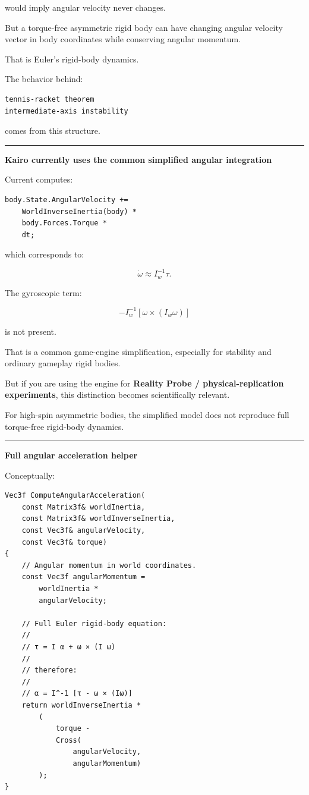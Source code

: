 would imply angular velocity never changes.

But a torque-free asymmetric rigid body can have changing angular velocity vector in body coordinates while conserving angular momentum.

That is Euler's rigid-body dynamics.

The behavior behind:

\begin{verbatim}
tennis-racket theorem
intermediate-axis instability
\end{verbatim}

comes from this structure.

\begin{center}\rule{0.5\linewidth}{0.5pt}\end{center}

\textbf{Kairo currently uses the common simplified angular integration}

Current  computes:

\begin{verbatim}
body.State.AngularVelocity +=
    WorldInverseInertia(body) *
    body.Forces.Torque *
    dt;
\end{verbatim}

which corresponds to:

\[
\dot\omega
\approx
I_w^{-1}\tau.
\]

The gyroscopic term:

\[
-I_w^{-1}
[
\omega\times(I_w\omega)
]
\]

is not present.

That is a common game-engine simplification, especially for stability and ordinary gameplay rigid bodies.

But if you are using the engine for \textbf{Reality Probe / physical-replication experiments}, this distinction becomes scientifically relevant.

For high-spin asymmetric bodies, the simplified model does not reproduce full torque-free rigid-body dynamics.

\begin{center}\rule{0.5\linewidth}{0.5pt}\end{center}

\textbf{Full angular acceleration helper}

Conceptually:

\begin{verbatim}
Vec3f ComputeAngularAcceleration(
    const Matrix3f& worldInertia,
    const Matrix3f& worldInverseInertia,
    const Vec3f& angularVelocity,
    const Vec3f& torque)
{
    // Angular momentum in world coordinates.
    const Vec3f angularMomentum =
        worldInertia *
        angularVelocity;

    // Full Euler rigid-body equation:
    //
    // τ = I α + ω × (I ω)
    //
    // therefore:
    //
    // α = I^-1 [τ - ω × (Iω)]
    return worldInverseInertia *
        (
            torque -
            Cross(
                angularVelocity,
                angularMomentum)
        );
}
\end{verbatim}

